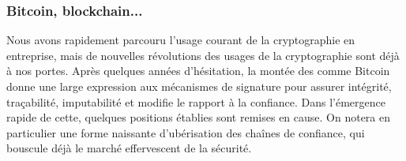\subsubsection{ Bitcoin, blockchain...}
Nous avons rapidement parcouru l'usage courant de la cryptographie en entreprise, mais de nouvelles révolutions des usages de la cryptographie sont déjà à nos portes. Après quelques années d'hésitation, la montée des comme Bitcoin donne une large expression aux mécanismes de signature pour assurer intégrité, traçabilité, imputabilité et modifie le rapport à la confiance. Dans l'émergence rapide de cette, quelques positions établies sont remises en cause. On notera en particulier une forme naissante d'ubérisation des chaînes de confiance, qui bouscule déjà le marché effervescent de la sécurité. 


